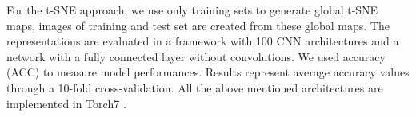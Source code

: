 \documentclass{article}
\begin{document}
For the t-SNE approach, we use only training sets to generate global t-SNE maps, images of training and test set are created from these global maps. The representations are evaluated in a framework with 100 CNN architectures and a network with a fully connected layer without convolutions. We used accuracy (ACC) to measure model performances. Results represent average accuracy values through a 10-fold cross-validation. All the above mentioned architectures are implemented in Torch7 \cite{torch7}. 



\end{document}
